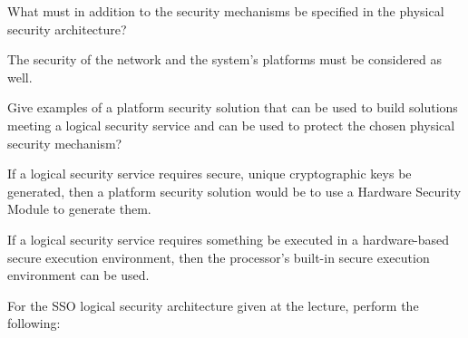 \begin{questions}
\question{} What must in addition to the security mechanisms be specified in the physical security architecture?
  \begin{solution}
    The security of the network and the system's platforms must be considered as well.
  \end{solution}

\question{} Give examples of a platform security solution that can be used to build solutions meeting a logical security service and can be used to protect the chosen physical security mechanism?
  \begin{solution}
    If a logical security service requires secure, unique cryptographic keys be generated, then a platform security solution would be to use a Hardware Security Module to generate them.

    If a logical security service requires something be executed in a hardware-based secure execution environment, then the processor's built-in secure execution environment can be used.
  \end{solution}

\question{} For the SSO logical security architecture given at the lecture, perform the following:
  \begin{parts}

\end{parts}
\end{questions}
